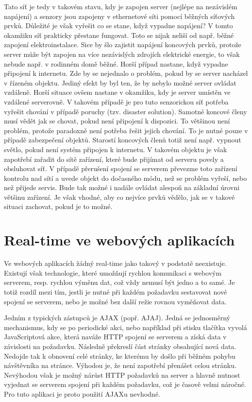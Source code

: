 Tato síť je tedy v takovém stavu, kdy je zapojen server (nejlépe na nezávislém napájení) a senzory jsou zapojeny v ethernetové síti pomocí běž\-ných síťových prvků. Důležité je však vyřešit co se stane, když vypadne napájení? V tomto okamžiku síť prakticky přestane fungovat. Toto se nijak neliší od např. běžné zapojení elektroinstalace. Sice by šlo zajistit napájení koncových prvků, protože server může být zapojen na více nezávislých zdro\-jích elektrické energie, to však nebude např. v rodinném domě běžné. Horší případ nastane, když vypadne připojení k internetu. Zde by se nejednalo o problém, pokud by se server nacházel v řízeném objektu. Jediný efekt by byl ten, že by nebylo možné server ovládat vzdáleně. Horší situace ovšem nastane v okamžiku, kdy je server umístěn ve vzdálené serverovně. V takovém případě je pro tuto senzorickou síť potřeba vyřešit chování v případě poruchy (tzv. disaster solution). Samotné koncové členy musí vědět jak se chovat, pokud není připojení k dispozici. To většinou není problém, protože paradoxně není potřeba řešit jejich chování. To je nutné pouze v případě zabezpečení objektů. Starostí koncových členů totiž není např. vypnout světlo, pokud není systém připojen k internetu. V takovém objektu je však zapotřebí zařadit do sítě zařízení, které bude přijímat od serveru povely a obsluhovat síť. V případě přerušení spojení se serverem převezme toto zařízení kontrolu nad sítí a uvede objekt do dočasného módu, než se problém vyřeší, nebo než přijede servis. Bude tak možné i nadále ovládat alespoň na základní úrovni většinu zařízení. Je však vhodné, aby co nejvíce prvků vědělo, jak se v takové situaci zachovat, pokud je to možné.

\section{Real-time ve webových aplikacích}
Ve webových aplikacích žádný real-time  jako takový v podstatě neexistuje. Existují však technologie, které umožňují rychlou komunikaci s webovým serverem, resp. rychlou výměnu dat, což vždy nemusí být jedno a to samé. Je totiž rozdíl mezi tím, jestli je nutné při každém požadavku sestavovat nové spojení se serverem, nebo je možné bez další režie rovnou vyměňovat data.

Jedním z typických zástupců je AJAX (popř. AJAJ). Jedná se jed\-no\-směr\-ný mechanismus, kdy se po periodické akci, nebo například při stisku tlačítka vyvolá JavaScriptová akce, která naváže HTTP spojení se serverem a získá data v závislosti na požadavku. Následně překreslí část stránky obsahující nová data. Nedojde tak k obnovení celé stránky, ke kterému by došlo při běžném pohybu návštěvníka na stránce. Výhodou je, že není zapotřebí přenášet celou stránku. Nevýhodou však je možný nárůst HTTP požadavků na server a hlavně nutnost vyjednat se serverem spojení při každém po\-ža\-dav\-ku, což je časově velmi náročné. Pro tuto aplikaci je proto použití AJAXu nevhodné. 

